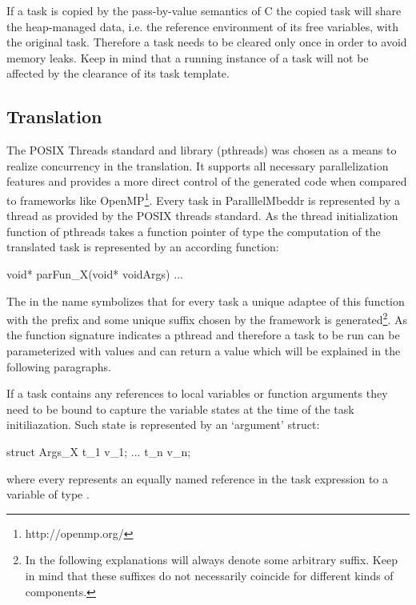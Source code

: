 If a task is copied by the pass-by-value semantics of C the copied task will share the heap-managed data, i.e. the reference environment of its free variables, with the original task. Therefore a task needs to be cleared only once in order to avoid memory leaks. Keep in mind that a running instance of a task will not be affected by the clearance of its task template. 

\subsection{Translation}
The POSIX Threads standard and library (pthreads) was chosen as a means to realize concurrency in the translation. It supports all necessary parallelization features and provides a more direct control of the generated code when compared to frameworks like OpenMP\footnote{http://openmp.org/}. Every task in ParalllelMbeddr is represented by a thread as provided by the POSIX threads standard. As the thread initialization function of pthreads takes a function pointer of type  the computation of the translated task is represented by an according function:
\begin{ccode}
void* parFun_X(void* voidArgs) {...}
\end{ccode}

The  in the name symbolizes that for every task a unique adaptee of this function with the prefix  and some unique suffix chosen by the framework is generated\footnote{In the following explanations  will always denote some arbitrary suffix. Keep in mind that these suffixes do not necessarily coincide for different kinds of components.}. As the function signature indicates a pthread and therefore a task to be run can be parameterized with values and can return a value which will be explained in the following paragraphs.

If a task contains any references to local variables or function arguments they need to be bound to capture the variable states at the time of the task initiliazation. Such state is represented by an `argument' struct:

\begin{ccode}
struct Args_X {
  t_1 v_1;
  ...
  t_n v_n;
}
\end{ccode}

where every  represents an equally named reference in the task expression to a variable of type .

